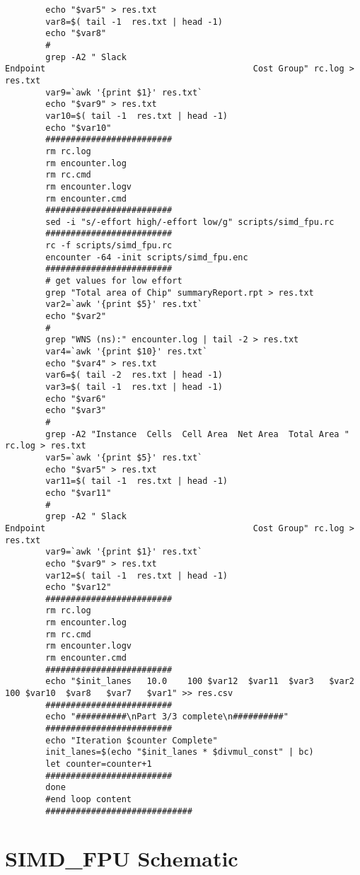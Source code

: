 \documentclass[conference]{IEEEtran}
\begin{document}
\begin{lstlisting}
		echo "$var5" > res.txt
		var8=$( tail -1  res.txt | head -1)
		echo "$var8"
		#
		grep -A2 " Slack                                          Endpoint                                         Cost Group" rc.log > res.txt
		var9=`awk '{print $1}' res.txt`
		echo "$var9" > res.txt
		var10=$( tail -1  res.txt | head -1)
		echo "$var10"
		#########################
		rm rc.log
		rm encounter.log
		rm rc.cmd
		rm encounter.logv
		rm encounter.cmd
		#########################
		sed -i "s/-effort high/-effort low/g" scripts/simd_fpu.rc
		#########################
		rc -f scripts/simd_fpu.rc
		encounter -64 -init scripts/simd_fpu.enc
		#########################
		# get values for low effort
		grep "Total area of Chip" summaryReport.rpt > res.txt
		var2=`awk '{print $5}' res.txt`
		echo "$var2"
		#
		grep "WNS (ns):" encounter.log | tail -2 > res.txt
		var4=`awk '{print $10}' res.txt`
		echo "$var4" > res.txt
		var6=$( tail -2  res.txt | head -1)
		var3=$( tail -1  res.txt | head -1)
		echo "$var6"
		echo "$var3"
		#
		grep -A2 "Instance  Cells  Cell Area  Net Area  Total Area " rc.log > res.txt
		var5=`awk '{print $5}' res.txt`
		echo "$var5" > res.txt
		var11=$( tail -1  res.txt | head -1)
		echo "$var11"
		#
		grep -A2 " Slack                                          Endpoint                                         Cost Group" rc.log > res.txt
		var9=`awk '{print $1}' res.txt`
		echo "$var9" > res.txt
		var12=$( tail -1  res.txt | head -1)
		echo "$var12"	
		#########################
		rm rc.log
		rm encounter.log
		rm rc.cmd
		rm encounter.logv
		rm encounter.cmd
		#########################
		echo "$init_lanes	10.0	100	$var12	$var11	$var3	$var2	100	$var10	$var8	$var7	$var1" >> res.csv
		#########################
		echo "##########\nPart 3/3 complete\n##########"
		#########################
		echo "Iteration $counter Complete"
		init_lanes=$(echo "$init_lanes * $divmul_const" | bc)
		let counter=counter+1
		#########################
		done
		#end loop content
		#############################
	\end{lstlisting}

\section{SIMD\_FPU Schematic}

\end{document}
